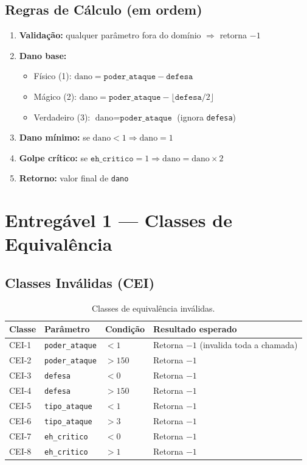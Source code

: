 \documentclass[conference, onecolumn]{IEEEtran}
\begin{document}
\subsection{Regras de Cálculo (em ordem)}

\begin{enumerate}
    \item \textbf{Validação:} qualquer parâmetro fora do domínio $\Rightarrow$ retorna $-1$
    \item \textbf{Dano base:}
    \begin{itemize}
        \item Físico (1): $\text{dano} = \texttt{poder\_ataque} - \texttt{defesa}$
        \item Mágico (2): $\text{dano} = \texttt{poder\_ataque} - \lfloor\texttt{defesa}/2\rfloor$
        \item Verdadeiro (3): $\text{dano} = \texttt{poder\_ataque}$ (ignora \texttt{defesa})
    \end{itemize}
    \item \textbf{Dano mínimo:} se $\text{dano} < 1 \Rightarrow \text{dano} = 1$
    \item \textbf{Golpe crítico:} se $\texttt{eh\_critico} = 1 \Rightarrow \text{dano} = \text{dano} \times 2$
    \item \textbf{Retorno:} valor final de \texttt{dano}
\end{enumerate}

\section{Entregável 1 — Classes de Equivalência}

\subsection{Classes Inválidas (CEI)}

\begin{table}[H]
\centering
\caption{Classes de equivalência inválidas.}
\begin{tabular}{@{}lllp{5.5cm}@{}}
\toprule
\textbf{Classe} & \textbf{Parâmetro} & \textbf{Condição} & \textbf{Resultado esperado} \\
\midrule
CEI-1 & \texttt{poder\_ataque} & $< 1$   & Retorna $-1$ (invalida toda a chamada) \\
CEI-2 & \texttt{poder\_ataque} & $> 150$ & Retorna $-1$ \\
CEI-3 & \texttt{defesa}        & $< 0$   & Retorna $-1$ \\
CEI-4 & \texttt{defesa}        & $> 150$ & Retorna $-1$ \\
CEI-5 & \texttt{tipo\_ataque}  & $< 1$   & Retorna $-1$ \\
CEI-6 & \texttt{tipo\_ataque}  & $> 3$   & Retorna $-1$ \\
CEI-7 & \texttt{eh\_critico}   & $< 0$   & Retorna $-1$ \\
CEI-8 & \texttt{eh\_critico}   & $> 1$   & Retorna $-1$ \\
\bottomrule
\end{tabular}
\end{table}
\end{document}
